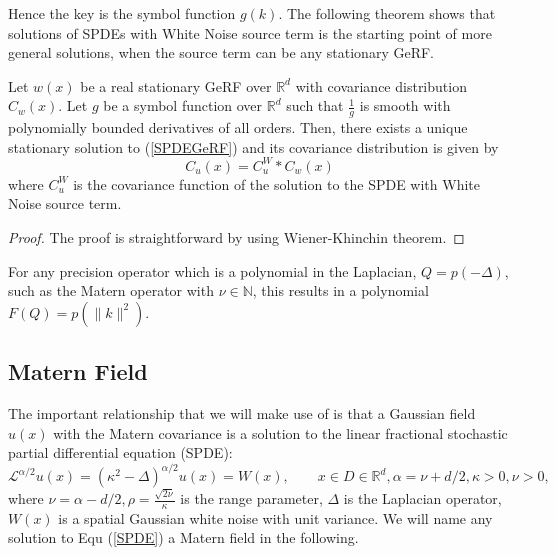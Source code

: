 Hence the key is the symbol function $g(k)$.
The following theorem shows that solutions of SPDEs with White Noise source term is the starting point of more general solutions, when the source term can be any stationary GeRF.
\begin{theorem}\label{uniquenessandexistence}
	Let $w(x)$ be a real stationary GeRF over $\mathbb{R}^d$ with covariance distribution $C_w(x)$. 
	Let $g$ be a symbol function over $\mathbb{R}^d$ such that $\frac{1}{g}$ is smooth with polynomially bounded derivatives of all orders. 
	Then, there exists a unique stationary solution to (\ref{SPDEGeRF}) and its covariance distribution is given by
\begin{equation}
	C_u(x) = C_u^W * C_w(x)
\end{equation}
where $C_u^W$ is the covariance function of the solution to the SPDE with White Noise source term.
\end{theorem}
\begin{proof}
	The proof is straightforward by using Wiener-Khinchin theorem.
\end{proof}
For any precision operator which is a polynomial in the Laplacian, $Q = p(-\Delta)$, such as the Matern operator with $\nu \in \mathbb{N}$, 
this results in a polynomial $F(Q) = p(\|k\|^2)$.
\subsection{Matern Field}
The important relationship that we will make use of is that a Gaussian field $u(x)$ with the Matern covariance is 
a solution to the linear fractional stochastic partial differential equation (SPDE):
\begin{equation}\label{SPDE}
	\mathcal{L}^{\alpha/2}u(x) = (\kappa^2 - \Delta)^{\alpha/2} u(x) = W(x), \qquad x\in D\in \mathbb{R}^d, \alpha=\nu + d/2, \kappa>0, \nu>0,
\end{equation}
where $\nu = \alpha - d/2, \rho = \frac{\sqrt{2\nu}}{\kappa}$ is the range parameter, $\Delta$ is the Laplacian operator, $W(x)$ is a spatial Gaussian white noise with unit variance.
We will name any solution to Equ (\ref{SPDE}) a Matern field in the following. 

